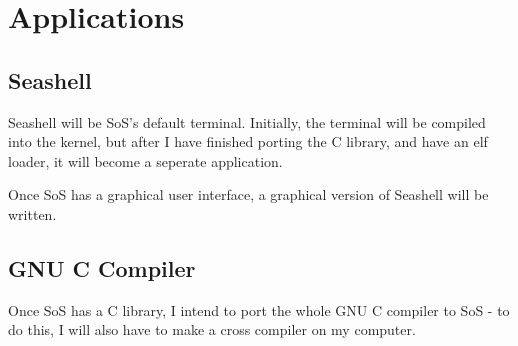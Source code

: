 \section{Applications}
\subsection{Seashell}
Seashell will be SoS's default terminal. Initially, the terminal will be compiled into the kernel, but after
I have finished porting the C library, and have an elf loader, it will become a seperate application.

Once SoS has a graphical user interface, a graphical version of Seashell will be written.

\subsection{GNU C Compiler}
Once SoS has a C library, I intend to port the whole GNU C compiler to SoS - to do this, I will also have to make a cross compiler on my computer.
